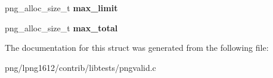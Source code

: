 \begin{DoxyCompactItemize}
\item 
\hypertarget{structstore__pool_a4a46b119f16c32a98561890ddc664abe}{png\+\_\+alloc\+\_\+size\+\_\+t {\bfseries max\+\_\+limit}}\label{structstore__pool_a4a46b119f16c32a98561890ddc664abe}

\item 
\hypertarget{structstore__pool_a30d0dd1c05b8bc9f236672dc219be64a}{png\+\_\+alloc\+\_\+size\+\_\+t {\bfseries max\+\_\+total}}\label{structstore__pool_a30d0dd1c05b8bc9f236672dc219be64a}

\end{DoxyCompactItemize}


The documentation for this struct was generated from the following file\+:\begin{DoxyCompactItemize}
\item 
png/lpng1612/contrib/libtests/pngvalid.\+c\end{DoxyCompactItemize}
